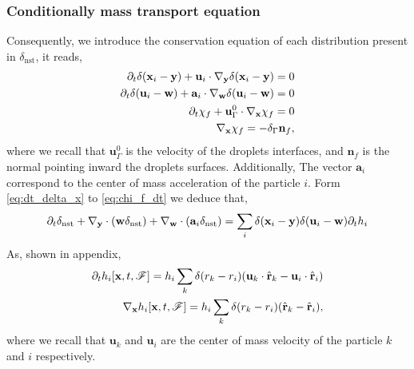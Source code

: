 \subsubsection{Conditionally mass transport equation}
Consequently, we introduce the  conservation equation of each distribution present in $\delta_\text{nst}$, it reads, 
\begin{align}
    \label{eq:dt_delta_x}
    \pddt \delta(\textbf{x}_i  - \textbf{y})
    +\textbf{u}_i  
    \cdot \pddy \delta(\textbf{x}_i  - \textbf{y})
    = 0\\
    \pddt \delta(\textbf{u}_i -\textbf{w})
    +\textbf{a}_i \cdot  \pddw   \delta(\textbf{u}_i  - \textbf{w})
    = 0\\
    \pddt \chi_f 
    + \textbf{u}_\Gamma^0 
    \cdot \pddx \chi_f = 0 \\
    \pddx \chi_f = - \delta_\Gamma \textbf{n}_f,
    \label{eq:chi_f_dt}
\end{align}
where we recall that $\textbf{u}_\Gamma^0$ is the velocity of the droplets interfaces, and $\textbf{n}_f$ is the normal pointing inward the droplets surfaces. 
Additionally, The vector $\textbf{a}_i$ correspond to the center of mass acceleration of the particle $i$. 
Form \ref{eq:dt_delta_x} to \ref{eq:chi_f_dt} we deduce that, 
\begin{align}
    \partial_t \delta_\text{nst}
    + {\mathbf{\nabla}_\textbf{y}} \cdot (\textbf{w} \delta_\text{nst})
    + {\mathbf{\nabla}_\textbf{w}} \cdot (\textbf{a}_i  \delta_\text{nst})
    = 
    \sum_i \delta(\textbf{x}_i -\textbf{y}) \delta(\textbf{u}_i - \textbf{w}) \partial_t h_i
\end{align}
As, shown in appendix, 
\begin{align}
    \partial_t  h_i[\textbf{x},t,\mathscr{F}]
    = 
    h_i
    \sum_k 
    \delta(r_k - r_i)
    (\textbf{u}_k  \cdot \hat{\textbf{r}}_k - \textbf{u}_i  \cdot \hat{\textbf{r}}_i)\\
    {\mathbf{\nabla}_\textbf{x}}  h_i[\textbf{x},t,\mathscr{F}]
    = 
    h_i
    \sum_k 
    \delta(r_k - r_i)
    ( \hat{\textbf{r}}_k -  \hat{\textbf{r}}_i),
\end{align}
where we recall that $\textbf{u}_k$ and $\textbf{u}_i$  are the center of mass velocity of the particle $k$ and $i$ respectively.
